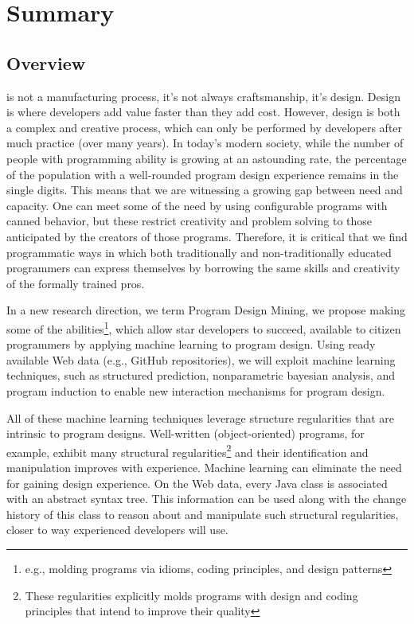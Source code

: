 \chapter{Summary}{}
\label{sec:intro}

\section*{Overview} %
\label{sec:overview}

 is not a manufacturing process, it's not 
always craftsmanship, it's design. Design is where developers add 
value faster than they add cost. However, design is both a complex 
and creative process, which can only be performed by developers after 
much practice (over many years). In today’s modern society, while the 
number of people with programming ability is growing at an astounding 
rate, the percentage of the population with a well-rounded program 
design experience remains in the single digits. This means that we are 
witnessing a growing gap between need and capacity. One can meet some of 
the need by using configurable programs with canned behavior, but these 
restrict creativity and problem solving to those anticipated by the 
creators of those programs. Therefore, it is critical that we find 
programmatic ways in which both traditionally and non-traditionally 
educated programmers can express themselves by borrowing the same skills 
and creativity of the formally trained pros.

In a new research direction, we term Program Design Mining, we propose  
making some of the abilities\footnote{e.g., molding programs via idioms, 
coding principles, and design patterns}, which allow star developers to 
succeed, available to citizen programmers by applying machine learning 
to program design.  Using ready available Web data (e.g., 
GitHub repositories), we will exploit machine learning techniques, such 
as structured prediction, nonparametric bayesian analysis, and program 
induction to enable new interaction mechanisms for program design.

All of these machine learning techniques leverage structure regularities 
that are intrinsic to program designs. Well-written (object-oriented) 
programs, for example, exhibit many structural regularities\footnote{These 
regularities explicitly molds programs with design and coding principles that 
intend to improve their quality} and their identification and manipulation 
improves with experience. Machine learning can eliminate the need for 
gaining design experience. On the Web data, every Java class is associated 
with an abstract syntax tree. This information can be used along with the 
change history of this class to reason about and manipulate such structural 
regularities, closer to way experienced developers will use. 

